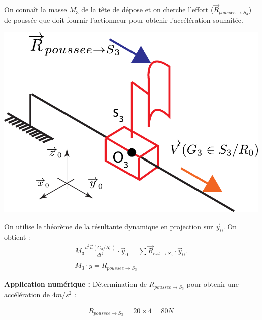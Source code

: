 \documentclass[10pt,fleqn]{article} %
\begin{document}
\begin{exemple}
\begin{minipage}{0.35\textwidth}
On connaît la masse $M_3$ de la tête de dépose et on cherche l'effort ($\overrightarrow{R}_{poussée\to S_3}$) de poussée que doit fournir l'actionneur pour obtenir l'accélération souhaitée.
\end{minipage}
\begin{minipage}{0.55\textwidth}
\begin{center}
\includegraphics[width=1.0\textwidth]{images/schema_cine_depose_translation.pdf}
\end{center}
\end{minipage}

On utilise le théorème de la résultante dynamique en projection sur $\overrightarrow{y}_0$. On obtient : 
\begin{align*}
M_3\frac{d^2\overrightarrow{a}(G_3/R_0)}{dt^2}\cdot \overrightarrow{y}_0=\sum \overrightarrow{R}_{ext\to S_3}\cdot \overrightarrow{y}_0.\\
\\
M_3\cdot \ddot{y}=R_{poussee\to S_3}
\end{align*} 

\textbf{Application numérique : }
Détermination de $R_{poussee\to S_3}$ pour obtenir une accélération de $4m/s^2$ :

\begin{align*}
R_{poussee\to S_3}=20\times 4=80N
\end{align*}
\end{exemple}
\end{document}
